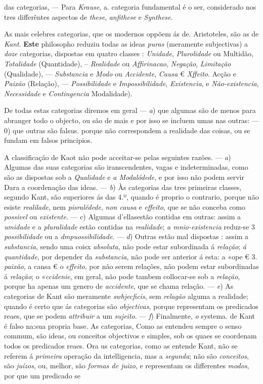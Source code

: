 das categorias, --- Para \emph{Krause}, a. categoria fundamental é o ser, considerado nos tres differêntes aspectos de \emph{these}, \emph{anfithese} e \emph{Synthese}.\par As mais celebres categorias, que os modernos oppõem ás de. Aristoteles, são as de \emph{Kant}. \textbf{Este} philosopho reduziu todas as ideas \emph{puras} (meramente subjectivas) a \emph{doze} categorias, dispostas em quatro classes : \emph{Unidade}, \emph{Plurolidade} ou Multidão, \emph{Totalidade} (Quantidade), -- \emph{Realidade} ou \emph{Affirinacao}, \emph{Negação}, \emph{Limitação} (Qualidade), --- \emph{Substancia} e \emph{Modo} ou \emph{Accidente}, \emph{Causa} € \emph{Xffeito}. Acção e \emph{Paixão} (Relação), --- \emph{Possibilidade} e \emph{Impossibilidade}, \emph{Existencia}, e \emph{Não-existencia}, \emph{Necessidade} e \emph{Contingencia} Modalidade).\par De todas estas categorias diremos em geral --- \emph{a}) que algumas são de menos para abranger todo o objecto, ou são de mais e por isso se incluem umas nas outras: --- 0) que outras são falsus. porque não correspondem a realidade das coisas, ou se fundam em falsos principios.\par A classificação de Kaot não pode acceitar-se pelas seguintes razões. --- \emph{a}) Algumas das suas categorias são iranscendentes, vagas e indeterminadas, como são as dispostas sob a \emph{Qualidade} e \emph{a Modalódede}, e por isso não podem servir Dara a coordenação das ideas. --- \emph{b}) Às categorias das tres primeiras classes, segundo Kant, são superiores ás das 4.º, quando é proprio o contrario, porque não esiste \emph{realilade}, nem \emph{pisralédede}, \emph{non causa} e \emph{effeito}, que se não conceba como \emph{possivel} ou \emph{existente}. --- c) Algumas d'ellasestão contidas em outras: assim a \emph{umidade} e a \emph{pluralidade} estão contidas na \emph{realidade}; \emph{a mnio-existencia} reduz-se 3 \emph{possibilidade} ou a \emph{dmpuossibilidade}. --- \emph{d}) Outras estão mal dispostas : assim a \emph{substancia}, sendo uma coisx \emph{absoluta}, não pode estar subordinada á \emph{relação}; \emph{á quantidade}, por depender da \emph{substancia}, não pode ser anterior á esta: a «ope € 3. \emph{paixão}, a cansa € o \emph{effeito}, por não serem relações, não podem estar subordinadas á \emph{relação}; o «\emph{ccidenie}, em geral, não pode tambem collocar-se sob a \emph{relação}, porque ha apenas um genero de \emph{accidente}, que se chama relação. --- \emph{e}) As categorias de Kant são meramente \emph{swhjecficis}, sem \emph{relagão} alguma a realidade; quando é certo que ás categorias são \emph{objectivas}, porque representam os predicados reaes, que se podem \emph{attribuir} a um \emph{sujeito}. --- \emph{f}) Finalmente, \emph{o} systema. de Kant é falso na:sua propria base. As categorias, Como as entendeu sempre o senso commum, são ideas, ou conceitos objectivos e simples, sob os quaes se coordenam todos os predicados reaes. Ora us categorias, como as entende Kant, não se referem á \emph{primeira} operação da intelligencia, mas a \emph{segunda}; não são \emph{conceitos}, são \emph{juízos}, ou, melhor, são \emph{formas de juizo}, e representam os differentes \emph{modos}, por que um predicado se 